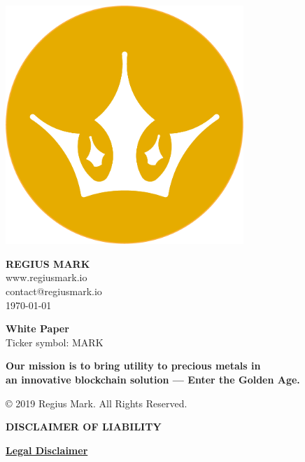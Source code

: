 \documentclass[12pt,a4paper]{article}
\begin{document}
  \begin{center}
    \includegraphics[width=90mm]{logo.png}\\
    \vspace{3mm}

    \vspace{3mm}
    \Huge{\textbf{REGIUS MARK}}\\
    \vspace{3mm}
    \normalsize{www.regiusmark.io}\\
    \normalsize{contact@regiusmark.io}\\
    \normalsize{\today}

    \vspace{30mm}
    \Large{\textbf{White Paper}}\\
    \Large{Ticker symbol: MARK}\\
    \vspace{30mm}

    \large{\textbf{Our mission is to bring utility to precious metals in}}\\
    \large{\textbf{an innovative blockchain solution --- Enter the Golden Age.}}

    \vspace*{\fill}
    \normalsize{© 2019 Regius Mark. All Rights Reserved.}
  \end{center}

  \newpage
  \begin{center}
    \large{\textbf{DISCLAIMER OF LIABILITY}}
  \end{center}

  \begin{center}
    \textbf{\underline{Legal Disclaimer}}
  \end{center}
\end{document}
